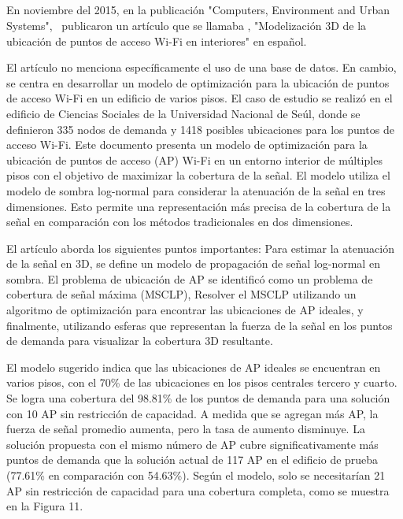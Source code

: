 \subsection{}
En noviembre del 2015, en la publicación "Computers, Environment and Urban Systems", \cite{pr_lee2015coverage3d} publicaron un artículo que se llamaba , "Modelización 3D de la ubicación de puntos de acceso Wi-Fi en interiores" en español.

El artículo no menciona específicamente el uso de una base de datos. En cambio, se centra en desarrollar un modelo de optimización para la ubicación de puntos de acceso Wi-Fi en un edificio de varios pisos. El caso de estudio se realizó en el edificio de Ciencias Sociales de la Universidad Nacional de Seúl, donde se definieron 335 nodos de demanda y 1418 posibles ubicaciones para los puntos de acceso Wi-Fi. Este documento presenta un modelo de optimización para la ubicación de puntos de acceso (AP) Wi-Fi en un entorno interior de múltiples pisos con el objetivo de maximizar la cobertura de la señal. El modelo utiliza el modelo de sombra log-normal para considerar la atenuación de la señal en tres dimensiones. Esto permite una representación más precisa de la cobertura de la señal en comparación con los métodos tradicionales en dos dimensiones.

El artículo aborda los siguientes puntos importantes: Para estimar la atenuación de la señal en 3D, se define un modelo de propagación de señal log-normal en sombra. El problema de ubicación de AP se identificó como un problema de cobertura de señal máxima (MSCLP), Resolver el MSCLP utilizando un algoritmo de optimización para encontrar las ubicaciones de AP ideales, y finalmente, utilizando esferas que representan la fuerza de la señal en los puntos de demanda para visualizar la cobertura 3D resultante.

El modelo sugerido indica que las ubicaciones de AP ideales se encuentran en varios pisos, con el 70\% de las ubicaciones en los pisos centrales tercero y cuarto. Se logra una cobertura del 98.81\% de los puntos de demanda para una solución con 10 AP sin restricción de capacidad. A medida que se agregan más AP, la fuerza de señal promedio aumenta, pero la tasa de aumento disminuye. La solución propuesta con el mismo número de AP cubre significativamente más puntos de demanda que la solución actual de 117 AP en el edificio de prueba (77.61\% en comparación con 54.63\%). Según el modelo, solo se necesitarían 21 AP sin restricción de capacidad para una cobertura completa, como se muestra en la Figura 11.

